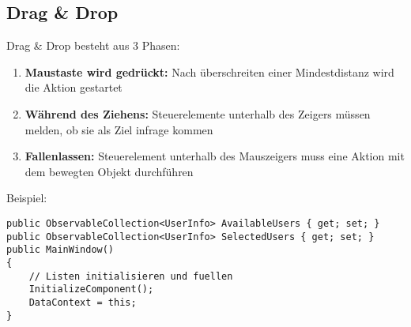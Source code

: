 \subsection{Drag \& Drop}
Drag \& Drop besteht aus 3 Phasen:
\begin{enumerate}
\item \textbf{Maustaste wird gedrückt:} Nach überschreiten einer Mindestdistanz wird die Aktion gestartet
\item \textbf{Während des Ziehens:} Steuerelemente unterhalb des Zeigers müssen melden, ob sie als Ziel infrage kommen
\item \textbf{Fallenlassen:} Steuerelement unterhalb des Mauszeigers muss eine Aktion mit dem bewegten Objekt durchführen
\end{enumerate}
Beispiel:
\begin{lstlisting}
public ObservableCollection<UserInfo> AvailableUsers { get; set; }
public ObservableCollection<UserInfo> SelectedUsers { get; set; }
public MainWindow()
{
    // Listen initialisieren und fuellen
    InitializeComponent();
    DataContext = this;
}
\end{lstlisting}
